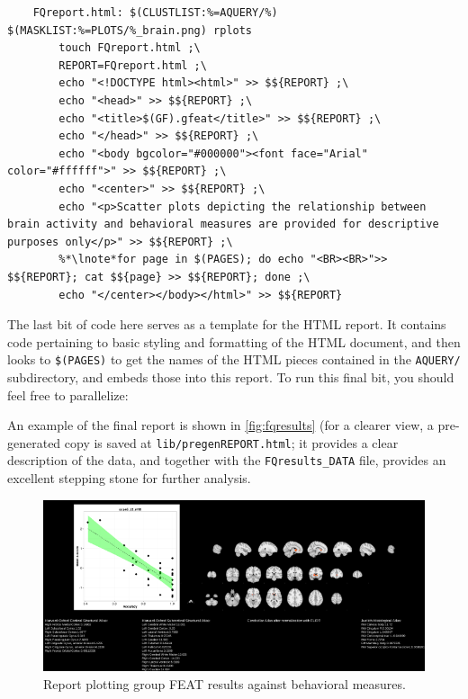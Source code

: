 \begin{lstlisting}
	FQreport.html: $(CLUSTLIST:%=AQUERY/%) $(MASKLIST:%=PLOTS/%_brain.png) rplots
		touch FQreport.html ;\
		REPORT=FQreport.html ;\
		echo "<!DOCTYPE html><html>" >> $${REPORT} ;\
		echo "<head>" >> $${REPORT} ;\
		echo "<title>$(GF).gfeat</title>" >> $${REPORT} ;\
		echo "</head>" >> $${REPORT} ;\
		echo "<body bgcolor="#000000"><font face="Arial" color="#ffffff">" >> $${REPORT} ;\
		echo "<center>" >> $${REPORT} ;\
		echo "<p>Scatter plots depicting the relationship between brain activity and behavioral measures are provided for descriptive purposes only</p>" >> $${REPORT} ;\
		%*\lnote*for page in $(PAGES); do echo "<BR><BR>">> $${REPORT}; cat $${page} >> $${REPORT}; done ;\
		echo "</center></body></html>" >> $${REPORT}
\end{lstlisting}

The last bit of code here serves as a template for the HTML report. It contains code pertaining to basic styling and formatting of the HTML document, and  then looks to \texttt{\$(PAGES)} to get the names of the HTML pieces contained in the \texttt{AQUERY/} subdirectory, and embeds those into this report. To run this final bit, you should feel free to parallelize:

An example of the final report is shown in \autoref{fig:fqresults} (for a clearer view, a pre-generated copy is saved at \texttt{lib/pregenREPORT.html}; it provides a clear description of the data, and together with the \texttt{FQresults_DATA} file, provides an excellent stepping stone for further analysis.

\begin{figure}
	\begin{center}
          \includegraphics[scale=.6]{images/SSreport.png}
		\caption{Report plotting group FEAT results against behavioral measures.}
                \label{fig:fqresults}
	\end{center}
\end{figure}
